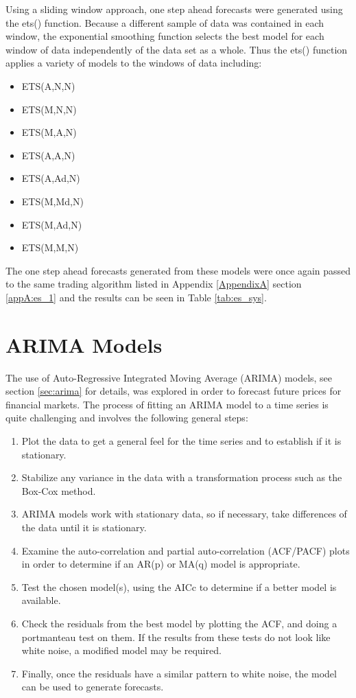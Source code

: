 
Using a sliding window approach, one step ahead forecasts were generated using the ets() function. Because a different sample of data was contained in each window, the exponential smoothing function selects the best model for each window of data independently of the data set as a whole. Thus the ets() function applies a variety of models to the windows of data including:

\begin{itemize}
\item ETS(A,N,N)
\item ETS(M,N,N)
\item ETS(M,A,N)
\item ETS(A,A,N)
\item ETS(A,Ad,N)
\item ETS(M,Md,N)
\item ETS(M,Ad,N)
\item ETS(M,M,N)
\end{itemize}


The one step ahead forecasts generated from these models were once again passed to the same trading algorithm listed in Appendix \ref{AppendixA} section \ref{appA:es_1} and the results can be seen in Table \ref{tab:es_sys}.



\section{ARIMA Models}
\label{arima_models}
The use of Auto-Regressive Integrated Moving Average (ARIMA) models, see section \ref{sec:arima} for details, was explored in order to forecast future prices for financial markets. 
The process of fitting an ARIMA model to a time series is quite challenging and involves the following general steps:

\begin{enumerate}
\item Plot the data to get a general feel for the time series and to establish if it is stationary.
\item Stabilize any variance in the data with a transformation process such as the Box-Cox method.
\item ARIMA models work with stationary data, so if necessary, take differences of the data until it is stationary.
\item Examine the auto-correlation and partial auto-correlation (ACF/PACF) plots in order to determine if an AR(p) or MA(q) model is appropriate.
\item Test the chosen model(s), using the AICc to determine if a better model is available.
\item Check the residuals from the best model by plotting the ACF, and doing a portmanteau test on them. If the results from these tests do not look like white noise, a modified model may be required.
\item Finally, once the residuals have a similar pattern to white noise, the model can be used to generate forecasts.
\end{enumerate}


